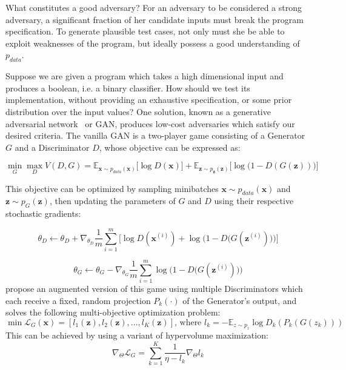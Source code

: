 \documentclass[12pt,initial,twoside,maitrise]{dms}
\numberwithin{equation}{section}
\numberwithin{table}{chapter}
\numberwithin{figure}{chapter}
\begin{document}
What constitutes a good adversary? For an adversary to be considered a strong adversary, a significant fraction of her candidate inputs must break the program specification. To generate plausible test cases, not only must she be able to exploit weaknesses of the program, but ideally possess a good understanding of $p_{data}$.

Suppose we are given a program which takes a high dimensional input and produces a boolean, i.e. a binary classifier. How should we test its implementation, without providing an exhaustive specification, or some prior distribution over the input values? One solution, known as a generative adversarial network~\citep{goodfellow2014gan} or GAN, produces low-cost adversaries which satisfy our desired criteria. The vanilla GAN is a two-player game consisting of a Generator $G$ and a Discriminator $D$, whose objective can be expressed as:

\begin{equation}
\min_G \max_D V(D, G) = \mathbb{E}_{\mathbf x \sim p_{data}(\mathbf x)}\big[\log D(\mathbf x)\big] + \mathbb{E}_{\mathbf z \sim p_{\mathbf z}(\mathbf z)}\big[\log\big(1 - D(G(\mathbf z))\big)\big]
\end{equation}

This objective can be optimized by sampling minibatches $\mathbf x \sim p_{data}(\mathbf x)$ and $\mathbf z \sim p_{G}(\mathbf z)$, then updating the parameters of $G$ and $D$ using their respective stochastic gradients:

\begin{equation}
\theta_D \leftarrow \theta_D + \nabla_{\theta_D}\frac{1}{m}\sum_{i=1}^m\Big[\log D(\mathbf x^{(i)}) + \log\Big(1 - D\big(G(\mathbf z^{(i)})\big)\Big)\Big]
\end{equation}

\begin{equation}
\theta_G \leftarrow \theta_G - \nabla_{\theta_G}\frac{1}{m}\sum_{i=1}^m \log\Big(1 - D\big(G(\mathbf z^{(i)})\big)\Big)
\end{equation}
%
\citet{albuquerque2019hgan} propose an augmented version of this game using multiple Discriminators which each receive a fixed, random projection $P_k(\cdot)$ of the Generator's output, and solves the following multi-objective optimization problem:
%
\begin{equation}
\min \mathbf{\mathcal{L}}_G(\mathbf x) = \left[l_1(\mathbf z), l_2(\mathbf z), \ldots, l_K(\mathbf z)\right] \text{, where } l_k = -\mathbb E_{z \sim p_z} \log D_k(P_k(G(z_k)))
\end{equation}
%
This can be achieved by using a variant of hypervolume maximization:
%
\begin{equation}
\nabla_\Theta \mathcal{L}_G = \sum_{k=1}^K \frac{1}{\eta - l_k}\nabla_\Theta l_k
\end{equation}
\end{document}
